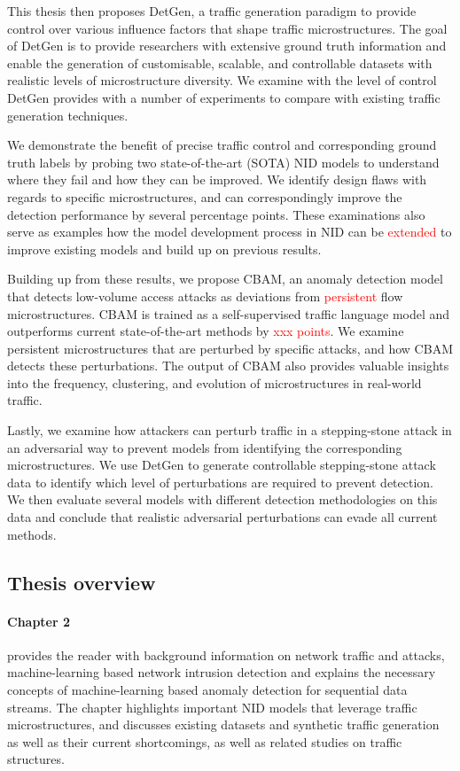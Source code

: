 This thesis then proposes DetGen, a traffic generation paradigm to provide control over various influence factors that shape traffic microstructures. The goal of DetGen is to provide researchers with extensive ground truth information and enable the generation of customisable, scalable, and controllable datasets with realistic levels of microstructure diversity. We examine with the level of control DetGen provides with a number of experiments to compare with existing traffic generation techniques. 

We demonstrate the benefit of precise traffic control and corresponding ground truth labels by probing two state-of-the-art (SOTA) NID models to understand where they fail and how they can be improved. We identify design flaws with regards to specific microstructures, and can correspondingly improve the detection performance by several percentage points. These examinations also serve as examples how the model development process in NID can be \textcolor{red}{extended} to improve existing models and build up on previous results.

Building up from these results, we propose CBAM, an anomaly detection model that detects low-volume access attacks as deviations from \textcolor{red}{persistent} flow microstructures. CBAM is trained as a self-supervised traffic language model and outperforms current state-of-the-art methods by \textcolor{red}{xxx points}. We examine persistent microstructures that are perturbed by specific attacks, and how CBAM detects these perturbations. The output of CBAM also provides valuable insights into the frequency, clustering, and evolution of microstructures in real-world traffic.

Lastly, we examine how attackers can perturb traffic in a stepping-stone attack in an adversarial way to prevent models from identifying the corresponding microstructures. We use DetGen to generate controllable stepping-stone attack data to identify which level of perturbations are required to prevent detection. We then evaluate several models with different detection methodologies on this data and conclude that realistic adversarial perturbations can evade all current methods.

\subsection{Thesis overview}

\paragraph{Chapter 2} provides the reader with background information on network traffic and attacks, machine-learning based network intrusion detection and explains the necessary concepts of machine-learning based anomaly detection for sequential data streams. The chapter highlights important NID models that leverage traffic microstructures, and discusses existing datasets and synthetic traffic generation as well as their current shortcomings, as well as related studies on traffic structures.

